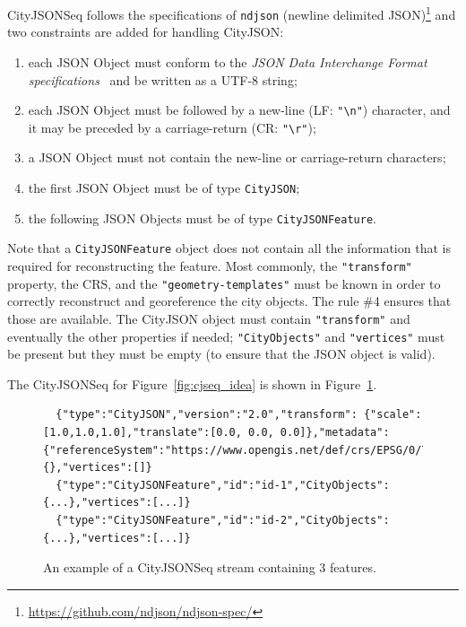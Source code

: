 \documentclass{isprs} %
\begin{document}
%

CityJSONSeq follows the specifications of \texttt{ndjson} (newline delimited JSON)\footnote{\url{https://github.com/ndjson/ndjson-spec/}} and two constraints are added for handling CityJSON\@:
\begin{enumerate}
  \item each JSON Object must conform to the \emph{JSON Data Interchange Format specifications}~\citep{IETF-JSON} and be written as a UTF-8 string;
  \item each JSON Object must be followed by a new-line (LF: \texttt{"\textbackslash n"}) character, and it may be preceded by a carriage-return (CR: \texttt{"\textbackslash r"});
  \item a JSON Object must not contain the new-line or carriage-return characters;
  \item the first JSON Object must be of type \texttt{CityJSON};
  \item the following JSON Objects must be of type \texttt{CityJSONFeature}.
\end{enumerate}

Note that a \texttt{CityJSONFeature} object does not contain all the information that is required for reconstructing the feature. 
Most commonly, the \texttt{"transform"} property, the CRS, and the \texttt{"geometry-templates"} must be known in order to correctly reconstruct and georeference the city objects. 
The rule \#4 ensures that those are available. 
The CityJSON object must contain \texttt{"transform"} and eventually the other properties if needed; \texttt{"CityObjects"} and \texttt{"vertices"} must be present but they must be empty (to ensure that the JSON object is valid).

%

The CityJSONSeq for Figure~\ref{fig:cjseq_idea} is shown in Figure~\ref{fig:stream}.
\begin{figure}
  \begin{lstlisting}
  {"type":"CityJSON","version":"2.0","transform": {"scale":[1.0,1.0,1.0],"translate":[0.0, 0.0, 0.0]},"metadata":{"referenceSystem":"https://www.opengis.net/def/crs/EPSG/0/7415"},"CityObjects":{},"vertices":[]}
  {"type":"CityJSONFeature","id":"id-1","CityObjects":{...},"vertices":[...]} 
  {"type":"CityJSONFeature","id":"id-2","CityObjects":{...},"vertices":[...]} 
  \end{lstlisting}
\caption{An example of a CityJSONSeq stream containing 3 features.}%
\label{fig:stream}
\end{figure}
\end{document}
